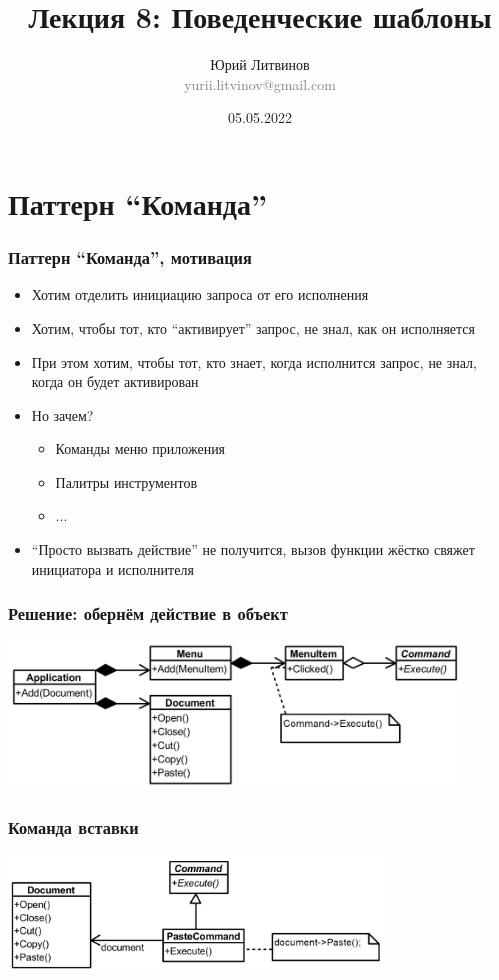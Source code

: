 \documentclass[xetex,mathserif,serif]{beamer}
\title[Шаблоны]{Лекция 8: Поведенческие шаблоны}
\author[Юрий Литвинов]{Юрий Литвинов\\\small{\textcolor{gray}{yurii.litvinov@gmail.com}}}
\date{05.05.2022}
\begin{document}
    \frame{\titlepage}

    \section{Паттерн ``Команда''}

    \begin{frame}
        \frametitle{Паттерн ``Команда'', мотивация}
        \begin{itemize}
            \item Хотим отделить инициацию запроса от его исполнения
            \item Хотим, чтобы тот, кто ``активирует'' запрос, не знал, как он исполняется
            \item При этом хотим, чтобы тот, кто знает, когда исполнится запрос, не знал, когда он будет активирован
            \item Но зачем?
            \begin{itemize}
                \item Команды меню приложения
                \item Палитры инструментов
                \item ...
            \end{itemize}
            \item ``Просто вызвать действие'' не получится, вызов функции жёстко свяжет инициатора и исполнителя
        \end{itemize}
    \end{frame}

    \begin{frame}
        \frametitle{Решение: обернём действие в объект}
        \begin{center}
            \includegraphics[width=0.9\textwidth]{commandExample.png}
        \end{center}
    \end{frame}

    \begin{frame}
        \frametitle{Команда вставки}
        \begin{center}
            \includegraphics[width=0.75\textwidth]{pasteCommand.png}
        \end{center}
    \end{frame}
\end{document}

